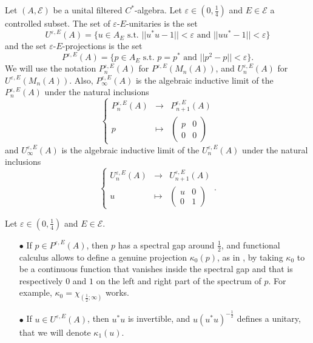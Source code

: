 \begin{definition}
Let $(A,\mathcal E)$ be a unital filtered $C^*$-algebra. Let $\varepsilon\in(0,\frac{1}{4})$ and $E\in \mathcal E$ a controlled subset. The set of $\varepsilon$-$E$-unitaries is the set 
\[U^{\varepsilon, E}(A)= \{u\in A_E \text{ s.t. } ||u^*u-1||<\varepsilon\text{ and }||uu^*-1||<\varepsilon \}\]
and the set $\varepsilon$-$E$-projections is the set 
\[P^{\varepsilon, E}(A)= \{p\in A_E \text{ s.t. } p=p^*\text{ and }||p^2-p||<\varepsilon \}.\]
We will use the notation $P_n^{\varepsilon, E}(A)$ for $P^{\varepsilon, E}(M_n(A))$, and $U_n^{\varepsilon, E}(A)$ for $U^{\varepsilon, E}(M_n(A))$. Also, $P_\infty^{\varepsilon, E}(A)$ is the algebraic inductive limit of the $P_n^{\varepsilon, E}(A)$ under the natural inclusions
\[\left\{\begin{array}{rcl}
	P^{\varepsilon,E}_n(A) 		& \rightarrow	& P^{\varepsilon,E}_{n+1}(A)\\ 
	p 		& \mapsto 	& \begin{pmatrix}p& 0 \\ 0&0 \end{pmatrix}
\end{array}\right.\]
and $U_\infty^{\varepsilon, E}(A)$ is the algebraic inductive limit of the $U_n^{\varepsilon, E}(A)$ under the natural inclusions
\[\left\{\begin{array}{rcl}
	U^{\varepsilon,E}_n(A) 		& \rightarrow	& U^{\varepsilon,E}_{n+1}(A)\\ 
	u 		& \mapsto 	& \begin{pmatrix}u & 0 \\ 0& 1 \end{pmatrix}
\end{array}\right. .\]
\end{definition}

\begin{rk}Let $\varepsilon\in (0,\frac{1}{4})$ and $E\in\mathcal E$.\\
\begin{itemize}
\item[$\bullet$] If $p\in P^{\varepsilon,E}(A)$, then $p$ has a spectral gap around $\frac{1}{2}$, and functional calculus allows to define a genuine projection $\kappa_0(p)$, as in \cite{OY2}, by taking $\kappa_0$ to be a continuous function that vanishes inside the spectral gap and that is respectively $0$ and $1$ on the left and right part of the spectrum of $p$. For example, $\kappa_0=\chi_{(\frac{1}{2};\infty)}$ works. %
\item[$\bullet$] If $u\in U^{\varepsilon,E}(A)$, then $u^* u$ is invertible, and $u(u^* u)^{-\frac{1}{2}}$ defines a unitary, that we will denote $\kappa_1(u)$.
\end{itemize}
\end{rk}

